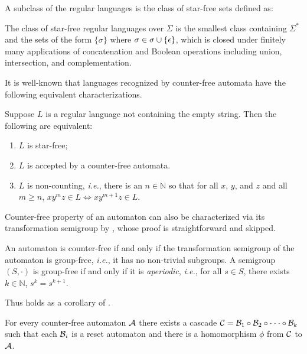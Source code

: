  A subclass of the regular languages is the class of star-free sets defined as:
\begin{definition}\label{defi:star_free_language}
	 The class of star-free regular languages over $\Sigma$ is the
smallest class containing $\Sigma^\ast$ and the sets of the form $\{  \sigma\}$ where $\sigma \in \sigma \cup \{ \epsilon\}$, which is
closed under finitely many applications of concatenation and Boolean operations including union, intersection, and complementation.
\end{definition}

It is well-known that languages recognized by counter-free automata have the following equivalent characterizations.

\begin{theorem}\label{thm:counter_free_language_three_characterization}
Suppose $L$ is a regular language not containing the empty string. Then the following are equivalent:
 \begin{enumerate}
 	\item $L$ is star-free;
 	\item $L$ is accepted by a counter-free automata.
 	\item $L$ is non-counting, \emph{i.e.}, there is an $n\in\mathbb{N}$ so that for all $x$, $y$, and $z$ and all $m \ge n$, $xy^mz \in  L  \iff xy^{m+1}z\in L$. 
 \end{enumerate}
\end{theorem}

Counter-free property of an automaton can also be characterized via its transformation semigroup by , whose proof is straightforward and skipped. 

\begin{lemma}\label{lem:aperiodic}
An automaton is counter-free if and only if the transformation semigroup of the automaton is group-free, \emph{i.e.}, it has no non-trivial subgroups. A semigroup $(S,\cdot)$ is group-free if and only if it is \emph{aperiodic}, \emph{i.e.}, for all $s\in S$, there exists $k\in\mathbb{N}$, $s^k = s^{k+1}$.
\end{lemma}


Thus  holds as a corollary of .

\begin{theorem}\label{cor:krohm_rhodes_aperiodic}
		For every counter-free automaton ${\mathcal{A}}$ there exists a cascade ${\mathcal{C}} = {\mathcal{B}}_1 \circ {\mathcal{B}}_2 \circ \cdot \cdot \cdot \circ {\mathcal{B}}_k$ such that each ${\mathcal{B}}_i$ is a reset automaton and there is a homomorphism $\phi$ from ${\mathcal{C}}$ to ${\mathcal{A}}$.
\end{theorem}


